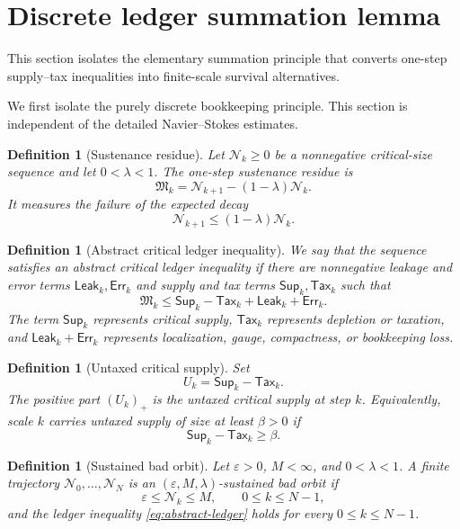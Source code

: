 \documentclass[11pt]{article}
\numberwithin{equation}{section}
\newtheorem{definition}[theorem]{Definition}
\newcommand{\eps}{\varepsilon}
\newcommand{\Supp}{\mathsf{Sup}}
\newcommand{\Tax}{\mathsf{Tax}}
\newcommand{\Leak}{\mathsf{Leak}}
\newcommand{\Err}{\mathsf{Err}}
\newcommand{\Mres}{\mathfrak M}
\newcommand{\pos}[1]{\left(#1\right)_+}
\newcommand{\N}{\mathcal N}
\begin{document}
\section{Discrete ledger summation lemma}\label{sec:discrete-ledger}
\noindent This section isolates the elementary summation principle that converts one-step supply--tax inequalities into finite-scale survival alternatives.

We first isolate the purely discrete bookkeeping principle.  This section is independent of the detailed Navier--Stokes estimates.

\begin{definition}[Sustenance residue]\label{def:sustenance-residue}
Let $\N_k\geq 0$ be a nonnegative critical-size sequence and let $0<\lambda<1$.  The one-step sustenance residue is
\[
\Mres_k=\N_{k+1}-(1-\lambda)\N_k.
\]
It measures the failure of the expected decay
\[
\N_{k+1}\leq (1-\lambda)\N_k.
\]
\end{definition}

\begin{definition}[Abstract critical ledger inequality]\label{def:abstract-ledger}
We say that the sequence satisfies an abstract critical ledger inequality if there are nonnegative leakage and error terms $\Leak_k,\Err_k$ and supply and tax terms $\Supp_k,\Tax_k$ such that
\begin{equation}\label{eq:abstract-ledger}
\Mres_k\leq \Supp_k-\Tax_k+\Leak_k+\Err_k.
\end{equation}
The term $\Supp_k$ represents critical supply, $\Tax_k$ represents depletion or taxation, and $\Leak_k+\Err_k$ represents localization, gauge, compactness, or bookkeeping loss.
\end{definition}

\begin{definition}[Untaxed critical supply]\label{def:untaxed}
Set
\[
U_k=\Supp_k-\Tax_k.
\]
The positive part $\pos{U_k}$ is the untaxed critical supply at step $k$.  Equivalently, scale $k$ carries untaxed supply of size at least $\beta>0$ if
\[
\Supp_k-\Tax_k\geq \beta.
\]
\end{definition}

\begin{definition}[Sustained bad orbit]\label{def:sustained-bad-orbit}
Let $\eps>0$, $M<\infty$, and $0<\lambda<1$.  A finite trajectory $\N_0,\ldots,\N_N$ is an $(\eps,M,\lambda)$-sustained bad orbit if
\[
\eps\leq \N_k\leq M,
\qquad 0\leq k\leq N-1,
\]
and the ledger inequality \eqref{eq:abstract-ledger} holds for every $0\leq k\leq N-1$.
\end{definition}
\end{document}
